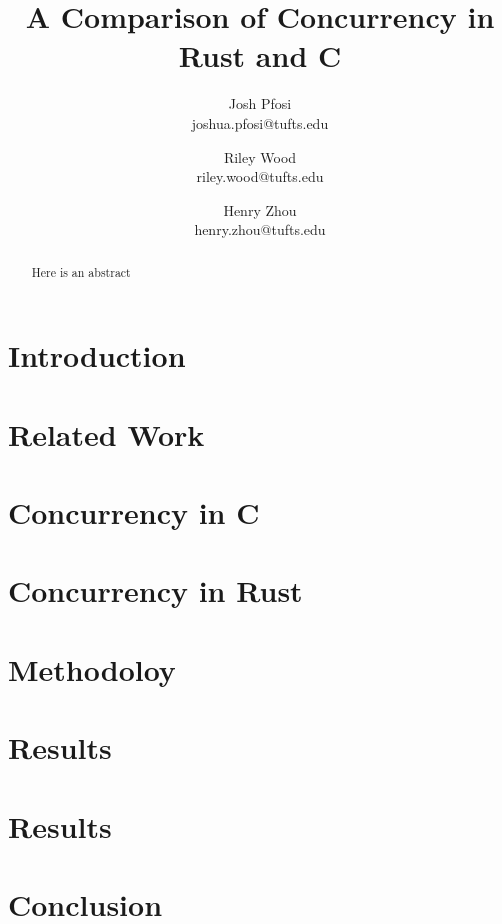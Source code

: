 \documentclass[11pt,twocolumn]{article}
\title{A Comparison of Concurrency in Rust and C}
\author{
    Josh Pfosi\\joshua.pfosi@tufts.edu
    \and
    Riley Wood\\riley.wood@tufts.edu
    \and
    Henry Zhou\\henry.zhou@tufts.edu
}
\date{}
\begin{document}
\maketitle

\begin{abstract}
  Here is an abstract
\end{abstract}


\section{Introduction}
\section{Related Work}
\section{Concurrency in C}
\section{Concurrency in Rust}
\section{Methodoloy}
\section{Results}
\section{Results}
\section{Conclusion}




\end{document}
